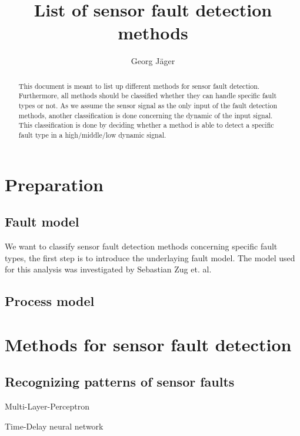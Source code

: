 \documentclass[a4paper,11pt]{article}
\title{List of sensor fault detection methods}
\author{Georg Jäger}
\begin{document}
\maketitle
\tableofcontents

\begin{abstract}
 This document is meant to list up different methods for sensor fault detection. Furthermore, all methods should be classified whether they can handle specific fault types or not. As we assume the sensor signal as the only input of the fault detection methods, another classification is done concerning the dynamic of the input signal. This classification is done by deciding whether a method is able to detect a specific fault type in a high/middle/low dynamic signal. 
\end{abstract}

\section{Preparation}
 
\subsection{Fault model}  
  We want to classify sensor fault detection methods concerning specific fault types, the first step is to introduce the underlaying fault model. The model used for this analysis was investigated by Sebastian Zug et. al. %
  

\subsection{Process model}


\section{Methods for sensor fault detection}


\subsection{Recognizing patterns of sensor faults}

Multi-Layer-Perceptron

Time-Delay neural network
\end{document}
